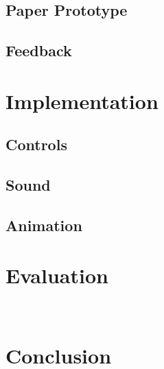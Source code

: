 \subsection{Paper Prototype}

\subsection{Feedback}


\section{Implementation}

\subsection{Controls}

\subsection{Sound}

\subsection{Animation}


\section{Evaluation}

\

\section{Conclusion}

